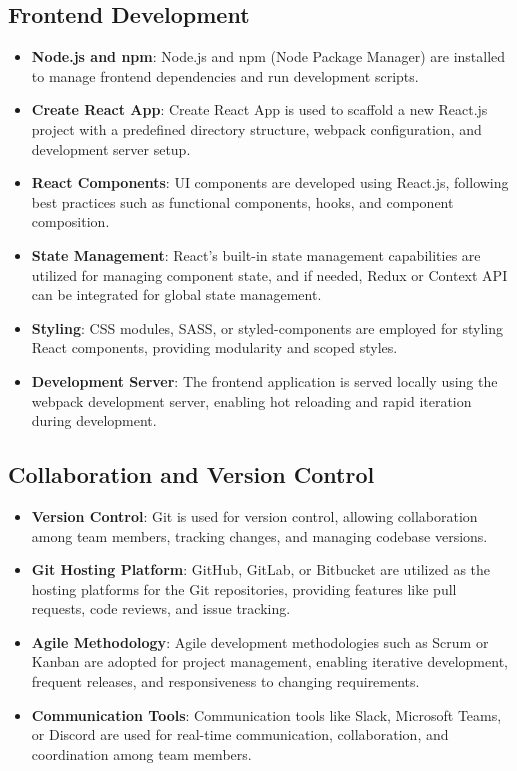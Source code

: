 \documentclass[a4paper, 12pt]{report}
\begin{document}
\subsection{Frontend Development}
\begin{itemize}
  \item \textbf{Node.js and npm}: Node.js and npm (Node Package Manager) are installed to manage frontend dependencies and run development scripts.
  \item \textbf{Create React App}: Create React App is used to scaffold a new React.js project with a predefined directory structure, webpack configuration, and development server setup.
  \item \textbf{React Components}: UI components are developed using React.js, following best practices such as functional components, hooks, and component composition.
  \item \textbf{State Management}: React's built-in state management capabilities are utilized for managing component state, and if needed, Redux or Context API can be integrated for global state management.
  \item \textbf{Styling}: CSS modules, SASS, or styled-components are employed for styling React components, providing modularity and scoped styles.
  \item \textbf{Development Server}: The frontend application is served locally using the webpack development server, enabling hot reloading and rapid iteration during development.
\end{itemize}
\subsection{Collaboration and Version Control}
\begin{itemize}
  \item \textbf{Version Control}: Git is used for version control, allowing collaboration among team members, tracking changes, and managing codebase versions.
  \item \textbf{Git Hosting Platform}: GitHub, GitLab, or Bitbucket are utilized as the hosting platforms for the Git repositories, providing features like pull requests, code reviews, and issue tracking.
  \item \textbf{Agile Methodology}: Agile development methodologies such as Scrum or Kanban are adopted for project management, enabling iterative development, frequent releases, and responsiveness to changing requirements.
  \item \textbf{Communication Tools}: Communication tools like Slack, Microsoft Teams, or Discord are used for real-time communication, collaboration, and coordination among team members.
\end{itemize}
\end{document}
